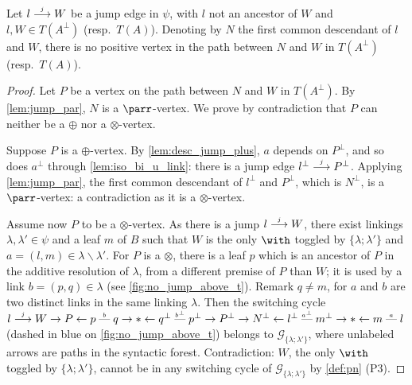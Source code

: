 \documentclass{lmcs}
\newcommand*{\orth}{^\perp} %
\newcommand*{\tens}{\otimes} %
\newcommand*{\resp}{resp.}
\newcommand*{\G}{\mathcal{G}}
\newcommand{\symboltext}[2]{\mathrel{\overset{\makebox[0pt]{\mbox{\normalfont\tiny\sffamily \ensuremath{#1}}}}{#2}}} %
\newcommand{\cadratin}{\mathrel{\text{\textemdash}}} %
\newcommand{\edgelab}[1]{\symboltext{#1}{\cadratin}} %
\newcommand{\jump}{\symboltext{j}{\longrightarrow}}
\begin{document}
\begin{lem}
\label{lem:no_jump_above_tp}
Let $l\jump W$ be a jump edge in $\psi$, with $l$ not an ancestor of $W$ and $l,W\in T(A\orth)$ (\resp\ $T(A)$).
Denoting by $N$ the first common descendant of $l$ and $W$, there is no positive vertex in the path between $N$ and $W$ in $T(A\orth)$ (\resp\ $T(A)$).
\end{lem}
\begin{proof}
Let $P$ be a vertex on the path between $N$ and $W$ in $T(A\orth)$.
By \autoref{lem:jump_par}, $N$ is a $\parr$-vertex.
We prove by contradiction that $P$ can neither be a $\oplus$ nor a $\tens$-vertex.

Suppose $P$ is a $\oplus$-vertex.
By \autoref{lem:desc_jump_plus}, $a$ depends on $P\orth$, and so does $a\orth$ through \autoref{lem:iso_bi_u_link}: there is a jump edge $l\orth\jump P\orth$.
Applying \autoref{lem:jump_par}, the first common descendant of $l\orth$ and $P\orth$, which is $N\orth$, is a $\parr$-vertex: a contradiction as it is a $\tens$-vertex.

Assume now $P$ to be a $\tens$-vertex.
As there is a jump $l\jump W$, there exist linkings $\lambda,\lambda'\in\psi$ and a leaf $m$ of $B$ such that $W$ is the only $\with$ toggled by $\{\lambda;\lambda'\}$ and $a=(l,m)\in\lambda\backslash\lambda'$.
For $P$ is a $\tens$, there is a leaf $p$ which is an ancestor of $P$ in the additive resolution of $\lambda$, from a different premise of $P$ than $W$; it is used by a link $b=(p,q)\in\lambda$ (see \autoref{fig:no_jump_above_t}).
Remark $q\neq m$, for $a$ and $b$ are two distinct links in the same linking $\lambda$.
Then the switching cycle
$l\jump W\rightarrow P\leftarrow p\edgelab{b}q\rightarrow\ast\leftarrow q\orth\edgelab{b\orth}p\orth\rightarrow P\orth\rightarrow N\orth\leftarrow l\orth\edgelab{a\orth}m\orth\rightarrow\ast\leftarrow m\edgelab{a}l$
(dashed in blue on \autoref{fig:no_jump_above_t})
belongs to $\G_{\{\lambda;\lambda'\}}$, where unlabeled arrows are paths in the syntactic forest.
Contradiction: $W$, the only $\with$ toggled by $\{\lambda;\lambda'\}$, cannot be in any switching cycle of $\G_{\{\lambda;\lambda'\}}$ by \autoref{def:pn} (P3).
\end{proof}
\end{document}
